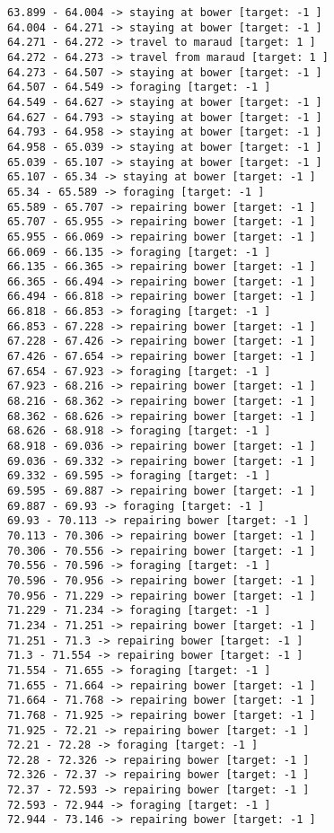 \documentclass[11pt]{article}
\begin{document}
\begin{Verbatim}[commandchars=\\\{\}]
63.899 - 64.004 -> staying at bower [target: -1 ]
64.004 - 64.271 -> staying at bower [target: -1 ]
64.271 - 64.272 -> travel to maraud [target: 1 ]
64.272 - 64.273 -> travel from maraud [target: 1 ]
64.273 - 64.507 -> staying at bower [target: -1 ]
64.507 - 64.549 -> foraging [target: -1 ]
64.549 - 64.627 -> staying at bower [target: -1 ]
64.627 - 64.793 -> staying at bower [target: -1 ]
64.793 - 64.958 -> staying at bower [target: -1 ]
64.958 - 65.039 -> staying at bower [target: -1 ]
65.039 - 65.107 -> staying at bower [target: -1 ]
65.107 - 65.34 -> staying at bower [target: -1 ]
65.34 - 65.589 -> foraging [target: -1 ]
65.589 - 65.707 -> repairing bower [target: -1 ]
65.707 - 65.955 -> repairing bower [target: -1 ]
65.955 - 66.069 -> repairing bower [target: -1 ]
66.069 - 66.135 -> foraging [target: -1 ]
66.135 - 66.365 -> repairing bower [target: -1 ]
66.365 - 66.494 -> repairing bower [target: -1 ]
66.494 - 66.818 -> repairing bower [target: -1 ]
66.818 - 66.853 -> foraging [target: -1 ]
66.853 - 67.228 -> repairing bower [target: -1 ]
67.228 - 67.426 -> repairing bower [target: -1 ]
67.426 - 67.654 -> repairing bower [target: -1 ]
67.654 - 67.923 -> foraging [target: -1 ]
67.923 - 68.216 -> repairing bower [target: -1 ]
68.216 - 68.362 -> repairing bower [target: -1 ]
68.362 - 68.626 -> repairing bower [target: -1 ]
68.626 - 68.918 -> foraging [target: -1 ]
68.918 - 69.036 -> repairing bower [target: -1 ]
69.036 - 69.332 -> repairing bower [target: -1 ]
69.332 - 69.595 -> foraging [target: -1 ]
69.595 - 69.887 -> repairing bower [target: -1 ]
69.887 - 69.93 -> foraging [target: -1 ]
69.93 - 70.113 -> repairing bower [target: -1 ]
70.113 - 70.306 -> repairing bower [target: -1 ]
70.306 - 70.556 -> repairing bower [target: -1 ]
70.556 - 70.596 -> foraging [target: -1 ]
70.596 - 70.956 -> repairing bower [target: -1 ]
70.956 - 71.229 -> repairing bower [target: -1 ]
71.229 - 71.234 -> foraging [target: -1 ]
71.234 - 71.251 -> repairing bower [target: -1 ]
71.251 - 71.3 -> repairing bower [target: -1 ]
71.3 - 71.554 -> repairing bower [target: -1 ]
71.554 - 71.655 -> foraging [target: -1 ]
71.655 - 71.664 -> repairing bower [target: -1 ]
71.664 - 71.768 -> repairing bower [target: -1 ]
71.768 - 71.925 -> repairing bower [target: -1 ]
71.925 - 72.21 -> repairing bower [target: -1 ]
72.21 - 72.28 -> foraging [target: -1 ]
72.28 - 72.326 -> repairing bower [target: -1 ]
72.326 - 72.37 -> repairing bower [target: -1 ]
72.37 - 72.593 -> repairing bower [target: -1 ]
72.593 - 72.944 -> foraging [target: -1 ]
72.944 - 73.146 -> repairing bower [target: -1 ]

\end{Verbatim}
\end{document}
